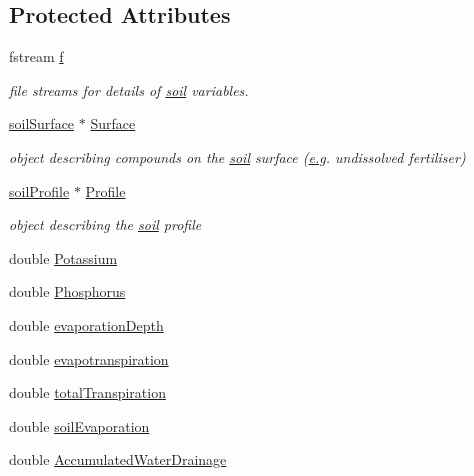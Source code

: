 \subsection*{Protected Attributes}
\begin{DoxyCompactItemize}
\item 
fstream \hyperlink{classsoil_a37ce966bebdb8775a666a3c0a6cd8bf3}{f}
\begin{DoxyCompactList}\small\item\em file streams for details of \hyperlink{classsoil}{soil} variables. \item\end{DoxyCompactList}\item 
\hyperlink{classsoil_surface}{soilSurface} $\ast$ \hyperlink{classsoil_ab5516aa25f35082aba80ca2795c68e4e}{Surface}
\begin{DoxyCompactList}\small\item\em object describing compounds on the \hyperlink{classsoil}{soil} surface (\hyperlink{typer_8h_ae4c405e5c68c6ec2c44bb6d6adfc2f6ca35c0bb7088830963c73dcf0470ab8922}{e.g}. undissolved fertiliser) \item\end{DoxyCompactList}\item 
\hyperlink{classsoil_profile}{soilProfile} $\ast$ \hyperlink{classsoil_ab36e32808c2cadf3b50cd18fdc06ca01}{Profile}
\begin{DoxyCompactList}\small\item\em object describing the \hyperlink{classsoil}{soil} profile \item\end{DoxyCompactList}\item 
double \hyperlink{classsoil_a65019dbe9779f5b002efc895a63a634f}{Potassium}
\item 
double \hyperlink{classsoil_a7860163d55668edc7d38fc3871a25a27}{Phosphorus}
\item 
double \hyperlink{classsoil_abae868b529287ef261d995d817163406}{evaporationDepth}
\item 
double \hyperlink{classsoil_a1b5519eb95daaba51a3326b0bbc4e653}{evapotranspiration}
\item 
double \hyperlink{classsoil_a7b54d79b2b2742e3a173c49e76a797c9}{totalTranspiration}
\item 
double \hyperlink{classsoil_a727b7e354f1982a033764880c47d7a81}{soilEvaporation}
\item 
double \hyperlink{classsoil_a8f203b5b85e7a616745ae8ec50e7f40d}{AccumulatedWaterDrainage}
\item 

\end{DoxyCompactItemize}
